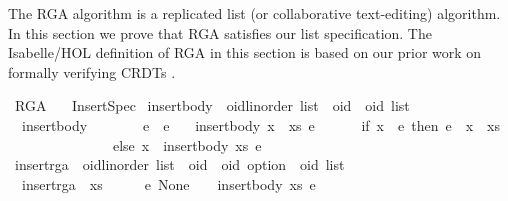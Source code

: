 %
\begin{isabellebody}%
%
%
\isamarkuptrue%
%
\begin{isamarkuptext}%
The RGA algorithm \cite{Roh:2011dw} is a replicated list (or
collaborative text-editing) algorithm. In this section we prove that
RGA satisfies our list specification. The Isabelle/HOL definition of
RGA in this section is based on our prior work on formally verifying
CRDTs \cite{Gomes:2017gy,Gomes:2017vo}.%
\end{isamarkuptext}\isamarkuptrue%
%
\isadelimtheory
%
\endisadelimtheory
%
\isatagtheory
{}\isamarkupfalse%
\ RGA\isanewline
\ \ \ Insert{\isacharunderscore}Spec\isanewline
{}%
\endisatagtheory
{\isafoldtheory}%
%
\isadelimtheory
%
\endisadelimtheory
\isanewline
\isanewline
{}\isamarkupfalse%
\ insert{\isacharunderscore}body\ {\isacharcolon}{\isacharcolon}\ {\isachardoublequoteopen}{\isacharprime}oid{\isacharcolon}{\isacharcolon}{\isacharbraceleft}linorder{\isacharbraceright}\ list\ {\isasymRightarrow}\ {\isacharprime}oid\ {\isasymRightarrow}\ {\isacharprime}oid\ list{\isachardoublequoteclose}\ \isanewline
\ \ {\isachardoublequoteopen}insert{\isacharunderscore}body\ {\isacharbrackleft}{\isacharbrackright}\ \ \ \ \ \ \ e\ {\isacharequal}\ {\isacharbrackleft}e{\isacharbrackright}{\isachardoublequoteclose}\ {\isacharbar}\isanewline
\ \ {\isachardoublequoteopen}insert{\isacharunderscore}body\ {\isacharparenleft}x\ {\isacharhash}\ xs{\isacharparenright}\ e\ {\isacharequal}\isanewline
\ \ \ \ \ {\isacharparenleft}if\ x\ {\isacharless}\ e\ then\ e\ {\isacharhash}\ x\ {\isacharhash}\ xs\isanewline
\ \ \ \ \ \ \ \ \ \ \ \ \ \ \ else\ x\ {\isacharhash}\ insert{\isacharunderscore}body\ xs\ e{\isacharparenright}{\isachardoublequoteclose}\isanewline
\isanewline
{}\isamarkupfalse%
\ insert{\isacharunderscore}rga\ {\isacharcolon}{\isacharcolon}\ {\isachardoublequoteopen}{\isacharprime}oid{\isacharcolon}{\isacharcolon}{\isacharbraceleft}linorder{\isacharbraceright}\ list\ {\isasymRightarrow}\ {\isacharparenleft}{\isacharprime}oid\ {\isasymtimes}\ {\isacharprime}oid\ option{\isacharparenright}\ {\isasymRightarrow}\ {\isacharprime}oid\ list{\isachardoublequoteclose}\ \isanewline
\ \ {\isachardoublequoteopen}insert{\isacharunderscore}rga\ \ xs\ \ \ \ \ \ {\isacharparenleft}e{\isacharcomma}\ None{\isacharparenright}\ \ \ {\isacharequal}\ insert{\isacharunderscore}body\ xs\ e{\isachardoublequoteclose}\ {\isacharbar}\isanewline

\end{isabellebody}
